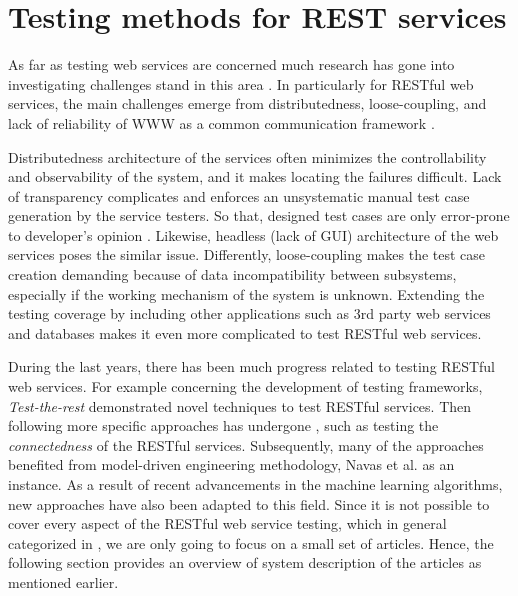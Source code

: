 \documentclass[english]{tktltiki}
\begin{document}
\section{Testing methods for REST services}
As far as testing web services are concerned much research has gone into investigating challenges stand in this area \cite{canfora2009service, bozkurt2013testing}. In particularly for RESTful web services, the main challenges emerge from distributedness, loose-coupling, and lack of reliability of WWW as a common communication framework \cite{chakrabarti2009test}. 

Distributedness architecture of the services often minimizes the controllability and observability of the system, and it makes locating the failures difficult. Lack of transparency complicates and enforces an unsystematic manual test case generation by the service testers. So that, designed test cases are only error-prone to developer's opinion \cite{navas2014rest}. Likewise, headless (lack of GUI) architecture of the web services poses the similar issue. Differently, loose-coupling makes the test case creation demanding because of data incompatibility between subsystems, especially if the working mechanism of the system is unknown. Extending the testing coverage by including other applications such as 3rd party web services and databases makes it even more complicated to test RESTful web services.

During the last years, there has been much progress related to testing RESTful web services. For example concerning the development of testing frameworks, \textit{Test-the-rest} \cite{chakrabarti2009test} demonstrated novel techniques to test RESTful services. Then following more specific approaches has undergone \cite{chakrabarti2010connectedness}, such as testing the \textit{connectedness} of the RESTful services. Subsequently, many of the approaches benefited from model-driven engineering methodology, Navas et al. \cite{navas2014rest} as an instance. As a result of recent advancements in the machine learning algorithms, new approaches \cite{navas2014rest, arcuri2017restful} have also been adapted to this field. Since it is not possible to cover every aspect of the RESTful web service testing, which in general categorized in \cite{canfora2009service, bozkurt2013testing}, we are only going to focus on a small set of articles. Hence, the following section provides an overview of system description of the articles as mentioned earlier.
\end{document}
